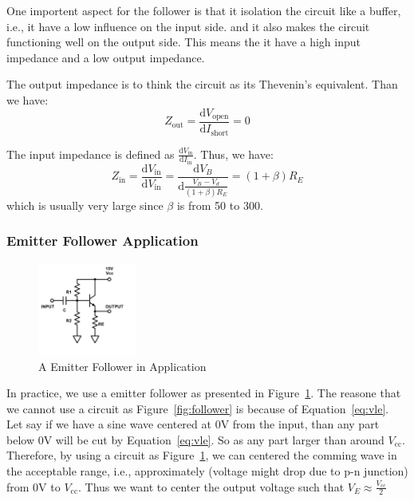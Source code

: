 \documentclass[aps,prl,reprint]{revtex4-1}
\newcommand{\de}{\mathrm{d}}
\newcommand{\vcc}{V_\text{cc}}
\begin{document}
One importent aspect for the follower is that it isolation the circuit like a buffer, i.e., it have a low influence on the input side. and it also makes the circuit functioning well on the output side. This means the it have a high input impedance and a low output impedance.

The output impedance is to think the circuit as its Thevenin's equivalent. Than we have:
\begin{equation*}
    Z_\text{out} = \frac{\de V_\text{open}}{\de I_\text{short}} = 0 
\end{equation*}

The input impedance is defined as $\frac{\de V_\text{in}}{\de I_\text{in}}$. Thus, we have:
\begin{equation*}
    Z_\text{in} = \frac{\de V_\text{in}}{\de V_\text{in}} = \frac{\de V_B}{\de \frac{V_B - V_d}{(1+\beta)R_E}} = (1+\beta)R_E
\end{equation*}
which is usually very large since $\beta$ is from 50 to 300.

\subsubsection{Emitter Follower Application}
\begin{figure}[h]
    \centering
    \includegraphics[height=1.2in]{image/Follower-Full.pdf}
    \caption{A Emitter Follower in Application}
    \label{fig:followerFull}
\end{figure}

In practice, we use a emitter follower as presented in Figure~\ref{fig:followerFull}. The reasone that we cannot use a circuit as Figure~\ref{fig:follower} is because of Equation~\ref{eq:vle}. Let say if we have a sine wave centered at 0V from the input, than any part below 0V will be cut by Equation~\ref{eq:vle}. So as any part larger than around $\vcc$. Therefore, by using a circuit as Figure~\ref{fig:followerFull}, we can centered the comming wave in the acceptable range, i.e., approximately (voltage might drop due to p-n junction) from 0V to $\vcc$. Thus we want to center the output voltage such that $V_E \approx \frac{\vcc}{2}$
\end{document}
